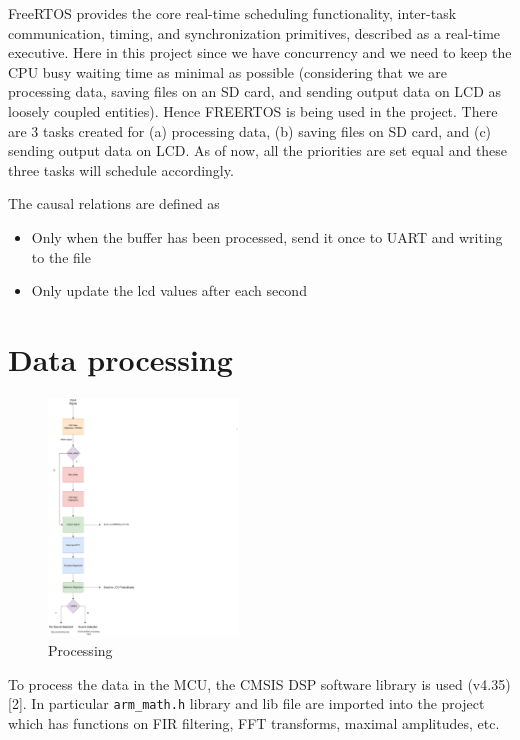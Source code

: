 \documentclass[11pt]{article}
\begin{document}
FreeRTOS provides the core real-time scheduling functionality, inter-task communication, timing, and synchronization primitives, described as a real-time executive. Here in this project since we have concurrency and we need to keep the CPU busy waiting time as minimal as possible (considering that we are processing data, saving files on an SD card, and sending output data on LCD as loosely coupled entities). Hence FREERTOS is being used in the project. There are 3 tasks created for (a) processing data, (b) saving files on SD card, and (c) sending output data on LCD. As of now, all the priorities are set equal and these three tasks will schedule accordingly.

The causal relations are defined as

\begin{itemize}
\item Only when the buffer has been processed, send it once to UART and writing to the file
\item Only update the lcd values after each second
\end{itemize}

\section{Data processing}
\label{sec:org14337a7}

\begin{figure}[H]
    \centering
    \includegraphics[width=0.45\textwidth, trim={0cm 0cm 15cm 0cm}, clip]{Processing.pdf}
    \caption{Processing}
    \end{figure}

To process the data in the MCU, the CMSIS DSP software library is used (v4.35) [2]. In particular \texttt{arm\_math.h} library and lib file are imported into the project which has functions on FIR filtering, FFT transforms, maximal amplitudes, etc.
\end{document}

